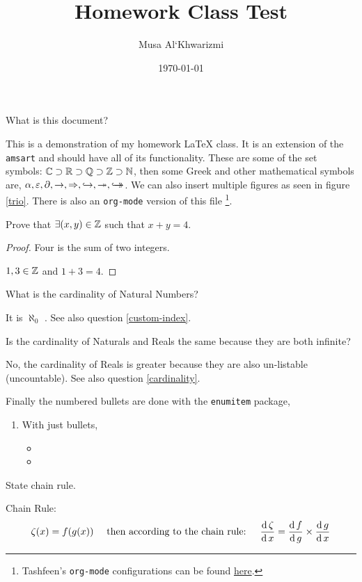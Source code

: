 \documentclass{../src/homework}
\author{Musa Al`Khwarizmi}
\date{\today}
\title{Homework Class Test}
\begin{document}
 \maketitle

\question What is this document?

This is a demonstration of my homework \LaTeX{} class. It is an extension of the \texttt{amsart} and should have all of its functionality. These are some of the set symbols: $\bC \supset \bR \supset \bQ \supset \bZ \supset \bN$, then some Greek and other mathematical symbols are, $\al, \ep, \p, \ra, \Ra, \injective, \surjective, \bijective$. We can also insert multiple figures as seen in figure \ref{trio}. There is also an \texttt{org-mode} version of this file \footnote{Tashfeen's \texttt{org-mode} configurations can be found \href{https://github.com/simurgh9/emacs786}{here}.}.


\question Prove that $\exists (x,y) \in \bZ$ such that $x+y = 4$.
\begin{proof} Four is the sum of two integers.
  
  $1,3 \in \bZ$ and $1+3=4$.
\end{proof}


\question\label{cardinality} What is the cardinality of Natural Numbers?

It is $\aleph_0$ \cite{arlinghaus1996part}. See also question \ref{custom-index}.

\question[99]\label{custom-index} Is the cardinality of Naturals and Reals the same because they are both infinite?

No, the cardinality of Reals is greater because they are also un-listable (uncountable). See also question \ref{cardinality}.


\question Finally the numbered bullets are done with the \texttt{enumitem} package,

\begin{enumerate}
  \item With just bullets,
  \begin{itemize}
    \item {}
    \item {}
  \end{itemize}
\end{enumerate}

\begin{bonus} State chain rule.

  Chain Rule:
  \[
    \zeta(x) = f(g(x)) \quad \text{ then according to the chain rule: } \quad
    \derivative{\zeta} = \derivative[g]{f} \times \derivative{g}
  \]
\end{bonus}
\end{document}

